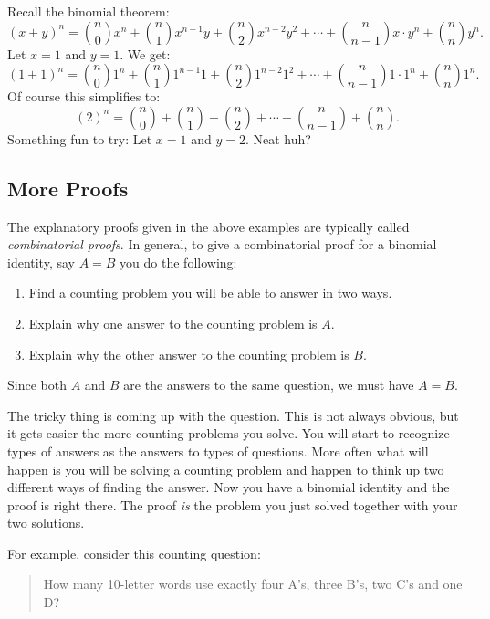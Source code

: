 \documentclass[12pt]{article}
\begin{document}
Recall the binomial theorem:
\[(x + y)^n = {n \choose 0}x^n + {n \choose 1}x^{n-1}y + {n \choose 2}x^{n-2}y^2 + \cdots + {n \choose n-1}x\cdot y^n + {n \choose n}y^n.\]
Let $x = 1$ and $y = 1$.  We get:
\[(1 + 1)^n = {n \choose 0}1^n + {n \choose 1}1^{n-1}1 + {n \choose 2}1^{n-2}1^2 + \cdots + {n \choose n-1}1\cdot 1^n + {n \choose n}1^n.\]
Of course this simplifies to:
\[(2)^n = {n \choose 0} + {n \choose 1} + {n \choose 2} + \cdots + {n \choose n-1} + {n \choose n}.\]
Something fun to try: Let $x = 1$ and $y = 2$.  Neat huh?

\subsection{More Proofs}

The explanatory proofs given in the above examples are typically called {\em combinatorial proofs}.  In general, to give a combinatorial proof for a binomial identity, say $A = B$ you do the following:
\begin{enumerate}
  \item Find a counting problem you will be able to answer in two ways.
  \item Explain why one answer to the counting problem is $A$.
  \item Explain why the other answer to the counting problem is $B$.
\end{enumerate}

Since both $A$ and $B$ are the answers to the same question, we must have $A = B$.

The tricky thing is coming up with the question.  This is not always obvious, but it gets easier the more counting problems you solve.  You will start to recognize types of answers as the answers to types of questions.  More often what will happen is you will be solving a counting problem and happen to think up two different ways of finding the answer.  Now you have a binomial identity and the proof is right there.  The proof \emph{is} the problem you just solved together with your two solutions.

For example, consider this counting question:

\begin{quote}
  How many 10-letter words use exactly four A's, three B's, two C's and one D?
\end{quote}
\end{document}
